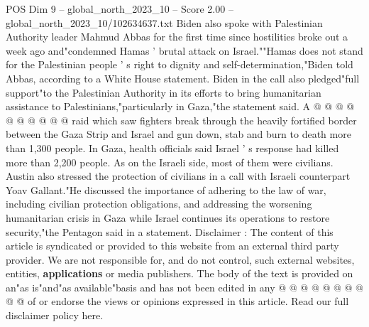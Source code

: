 \begin{textsample}{POS Dim 9 – global\_north\_2023\_10 – Score 2.00 – global\_north\_2023\_10/102634637.txt}
Biden also spoke with Palestinian Authority leader Mahmud Abbas for the first time since hostilities broke out a week ago and"condemned Hamas ' brutal attack on Israel.""Hamas does not stand for the Palestinian people ' s right to dignity and self-determination,"Biden told Abbas, according to a White House statement.
Biden in the call also pledged"full support"to the Palestinian Authority in its efforts to bring humanitarian assistance to Palestinians,"particularly in Gaza,"the statement said.
A @ @ @ @ @ @ @ @ @ @ raid which saw fighters break through the heavily fortified border between the Gaza Strip and Israel and gun down, stab and burn to death more than 1,300 people.
In Gaza, health officials said Israel ' s response had killed more than 2,200 people.
As on the Israeli side, most of them were civilians.
Austin also stressed the protection of civilians in a call with Israeli counterpart Yoav Gallant."He discussed the importance of adhering to the law of war, including civilian protection obligations, and addressing the worsening humanitarian crisis in Gaza while Israel continues its operations to restore security,"the Pentagon said in a statement.
Disclaimer : The content of this article is syndicated or provided to this website from an external third party provider.
We are not responsible for, and do not control, such external websites, entities, \textbf{applications} or media publishers.
The body of the text is provided on an"as is"and"as available"basis and has not been edited in any @ @ @ @ @ @ @ @ @ @ of or endorse the views or opinions expressed in this article.
Read our full disclaimer policy here.

\end{textsample}
